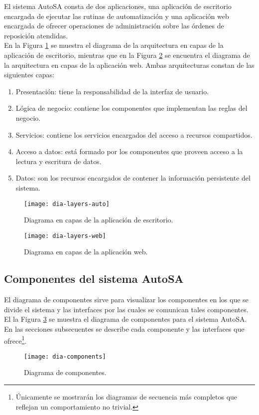 El sistema AutoSA consta de dos aplicaciones, una aplicación de escritorio encargada de ejecutar las rutinas de automatización y una aplicación web encargada de ofrecer operaciones de administración sobre las órdenes de reposición atendidas.\\
En la Figura \ref{fig:dia-layers-auto} se muestra el diagrama de la arquitectura en capas de la aplicación de escritorio, mientras que en la Figura \ref{fig:dia-layers-web} se encuentra el diagrama de la arquitectura en capas de la aplicación web. Ambas arquitecturas constan de las siguientes capas:
\begin{enumerate}
	\item Presentación: tiene la responsabilidad de la interfaz de usuario.
	\item Lógica de negocio: contiene los componentes que implementan las reglas del negocio.
	\item Servicios: contiene los servicios encargados del acceso a recursos compartidos.
	\item Acceso a datos: está formado por los componentes que proveen acceso a la lectura y escritura de datos.
	\item Datos: son los recursos encargados de contener la información persistente del sistema.
\end{enumerate}


\begin{figure}[h]
\centering
\texttt{[image: dia-layers-auto]}
\caption{Diagrama en capas de la aplicación de escritorio.}
\label{fig:dia-layers-auto}
\end{figure}

\begin{figure}[h]
\centering
\texttt{[image: dia-layers-web]}
\caption{Diagrama en capas de la aplicación web.}
\label{fig:dia-layers-web}
\end{figure}


\subsection{Componentes del sistema AutoSA}
El diagrama de componentes sirve para visualizar los componentes en los que se divide el sistema y las interfaces por las cuales se comunican tales componentes. El la Figura \ref{fig:dia-components} se muestra el diagrama de componentes para el sistema AutoSA. En las secciones subsecuentes se describe cada componente y las interfaces que ofrece\footnote{Únicamente se mostrarán los diagramas de secuencia más completos que reflejan un comportamiento no trivial.}.
\begin{figure}[h]
\centering
\texttt{[image: dia-components]}
\caption{Diagrama de componentes.}
\label{fig:dia-components}
\end{figure}

